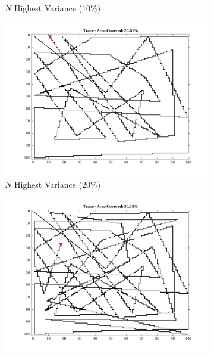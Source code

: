 \begin{figure}[htb!]
\begin{subfigure}[t]{0.32\textwidth}
        \captionsetup{skip=0.20\baselineskip,size=footnotesize}
        \caption{$N$ Highest Variance ($10\%$)}
    \end{subfigure}%
    \begin{subfigure}[t]{0.32\textwidth}
        \centering
        \includegraphics[width=\linewidth]{figures/hbresults/path_nnhv_20p_100x100_sf_100_seed_2.png}
        \ssp
        \captionsetup{skip=0.20\baselineskip,size=footnotesize}
        \caption{$N$ Highest Variance ($20\%$)}
    \end{subfigure}%
    \begin{subfigure}[t]{0.32\textwidth}
        \centering
        \includegraphics[width=\linewidth]{figures/hbresults/path_nnhv_30p_100x100_sf_100_seed_2.png}

\end{subfigure}
\end{figure}
